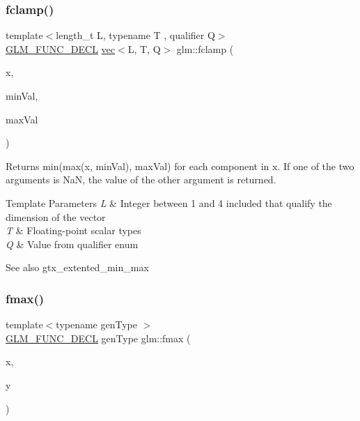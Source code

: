 \subsubsection{\texorpdfstring{fclamp()}{fclamp()}\hspace{0.1cm}{\footnotesize\ttfamily [3/3]}}
{\footnotesize\ttfamily template$<$length\+\_\+t L, typename T , qualifier Q$>$ \\
\mbox{\hyperlink{setup_8hpp_ab2d052de21a70539923e9bcbf6e83a51}{G\+L\+M\+\_\+\+F\+U\+N\+C\+\_\+\+D\+E\+CL}} \mbox{\hyperlink{structglm_1_1vec}{vec}}$<$L, T, Q$>$ glm\+::fclamp (\begin{DoxyParamCaption}\item[{\mbox{\hyperlink{structglm_1_1vec}{vec}}$<$ L, T, Q $>$ const \&}]{x,  }\item[{\mbox{\hyperlink{structglm_1_1vec}{vec}}$<$ L, T, Q $>$ const \&}]{min\+Val,  }\item[{\mbox{\hyperlink{structglm_1_1vec}{vec}}$<$ L, T, Q $>$ const \&}]{max\+Val }\end{DoxyParamCaption})}

Returns min(max(x, min\+Val), max\+Val) for each component in x. If one of the two arguments is NaN, the value of the other argument is returned.


\begin{DoxyTemplParams}{Template Parameters}
{\em L} & Integer between 1 and 4 included that qualify the dimension of the vector \\
\hline
{\em T} & Floating-\/point scalar types \\
\hline
{\em Q} & Value from qualifier enum\\
\hline
\end{DoxyTemplParams}
\begin{DoxySeeAlso}{See also}
gtx\+\_\+extented\+\_\+min\+\_\+max 
\end{DoxySeeAlso}
\mbox{\label{group__gtx__extended__min__max_gae5792cb2b51190057e4aea027eb56f81}} 
\subsubsection{\texorpdfstring{fmax()}{fmax()}\hspace{0.1cm}{\footnotesize\ttfamily [1/3]}}
{\footnotesize\ttfamily template$<$typename gen\+Type $>$ \\
\mbox{\hyperlink{setup_8hpp_ab2d052de21a70539923e9bcbf6e83a51}{G\+L\+M\+\_\+\+F\+U\+N\+C\+\_\+\+D\+E\+CL}} gen\+Type glm\+::fmax (\begin{DoxyParamCaption}\item[{gen\+Type}]{x,  }\item[{gen\+Type}]{y }\end{DoxyParamCaption})}


